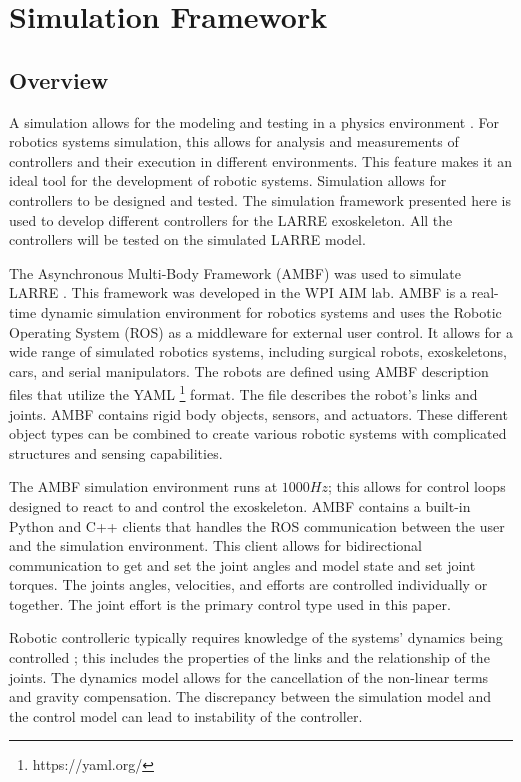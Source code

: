 \chapter{Simulation Framework}
\label{sec:sim}
\section{Overview}

A simulation allows for the modeling and testing in a physics environment \cite{vzlajpah2008simulation}. For robotics systems simulation, this allows for analysis and measurements of controllers and their execution in different environments. This feature makes it an ideal tool for the development of robotic systems. Simulation allows for controllers to be designed and tested. The simulation framework presented here is used to develop different controllers for the LARRE exoskeleton. All the controllers will be tested on the simulated LARRE model. 

The Asynchronous Multi-Body Framework (AMBF) was used to simulate LARRE \cite{AMBF}. This framework was developed in the WPI AIM lab. 
AMBF is a real-time dynamic simulation environment for robotics systems and uses the Robotic Operating System (ROS)\cite{quigley2009ros} as a middleware for external user control. It allows for a wide range of simulated robotics systems, including surgical robots, exoskeletons, cars, and serial manipulators. The robots are defined using AMBF description files that utilize the YAML \footnote{https://yaml.org/} format. The file describes the robot's links and joints. AMBF contains rigid body objects, sensors, and actuators. These different object types can be combined to create various robotic systems with complicated structures and sensing capabilities. 
 
 
 The AMBF simulation environment runs at $1000Hz$; this allows for control loops designed to react to and control the exoskeleton.  AMBF contains a built-in Python and C++ clients that handles the ROS communication between the user and the simulation environment. This client allows for bidirectional communication to get and set the joint angles and model state and set joint torques. The joints angles, velocities, and efforts are controlled individually or together. The joint effort is the primary control type used in this paper. 
 
Robotic controlleric typically requires knowledge of the systems' dynamics being controlled \cite{piltan2012design}; this includes the properties of the links and the relationship of the joints. The dynamics model allows for the cancellation of the non-linear terms and gravity compensation. The discrepancy between the simulation model and the control model can lead to instability of the controller. 
 
